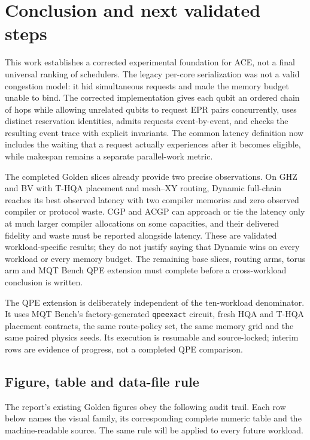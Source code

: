 \chapter{Conclusion and next validated steps}

This work establishes a corrected experimental foundation for ACE, not a final
universal ranking of schedulers. The legacy per-core serialization was not a
valid congestion model: it hid simultaneous requests and made the memory budget
unable to bind. The corrected implementation gives each qubit an ordered chain
of hops while allowing unrelated qubits to request EPR pairs concurrently,
uses distinct reservation identities, admits requests event-by-event, and checks
the resulting event trace with explicit invariants. The common latency definition
now includes the waiting that a request actually experiences after it becomes
eligible, while makespan remains a separate parallel-work metric.

The completed Golden slices already provide two precise observations. On GHZ and
BV with T-HQA placement and mesh--XY routing, Dynamic full-chain reaches its
best observed latency with two compiler memories and zero observed compiler or
protocol waste. CGP and ACGP can approach or tie the latency only at much larger
compiler allocations on some capacities, and their delivered fidelity and waste
must be reported alongside latency. These are validated workload-specific
results; they do not justify saying that Dynamic wins on every workload or every
memory budget. The remaining base slices, routing arms, torus arm and MQT Bench
QPE extension must complete before a cross-workload conclusion is written.

The QPE extension is deliberately independent of the ten-workload denominator.
It uses MQT Bench's factory-generated \texttt{qpeexact} circuit, fresh HQA and
T-HQA placement contracts, the same route-policy set, the same memory grid and
the same paired physics seeds. Its execution is resumable and source-locked;
interim rows are evidence of progress, not a completed QPE comparison.

\section{Figure, table and data-file rule}
The report's existing Golden figures obey the following audit trail. Each row
below names the visual family, its corresponding complete numeric table and the
machine-readable source. The same rule will be applied to every future workload.

